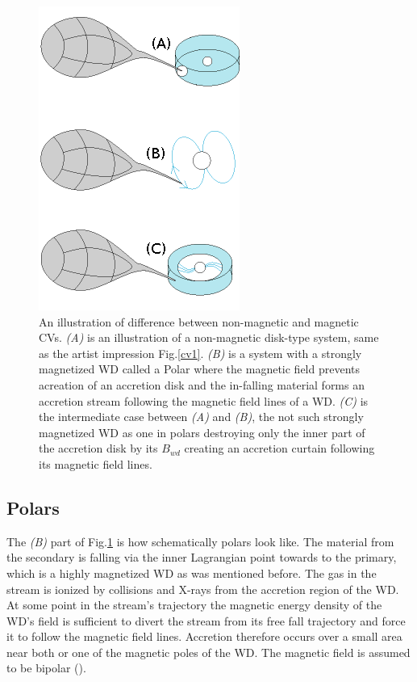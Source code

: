 \documentclass[oneside,a4paper,11pt]{report}
\begin{document}
\begin{figure}[hbt!]
\centering
\includegraphics[totalheight=5cm]{plot/binall}
\caption{An illustration of difference between non-magnetic and magnetic CVs. \textit{(A)} is an illustration of a non-magnetic 
disk-type system, same as the artist impression Fig.\ref{cv1}. \textit{(B)} is a system with a strongly magnetized WD called a Polar 
where the magnetic field prevents acreation of an accretion disk and the in-falling material forms an accretion stream following the 
magnetic field lines of a WD.
\textit{(C)} is the intermediate case between \textit{(A)} and \textit{(B)}, the not such strongly magnetized WD as one in polars 
destroying only the inner part of the accretion disk by its $B_{wd}$ creating an accretion curtain following its magnetic field lines. }
\label{all_typescv} 
\end{figure}

\subsection{Polars}
The \textit{(B)} part of Fig.\ref{all_typescv} is how schematically polars look like. The material from the secondary is falling via 
the inner Lagrangian point towards to the primary, which is a highly magnetized WD as was mentioned before. The gas in the
 stream is ionized by collisions and X-rays from the accretion region of the WD. At some point in the stream's trajectory 
the magnetic energy density of the WD's field is sufficient to divert the stream from its free fall trajectory and force 
it to follow the magnetic field lines. Accretion therefore occurs over a small area near both or one of the magnetic poles 
of the WD. The magnetic field is assumed to be bipolar (\citet{1990SSRv...54..195C}).
\end{document}
